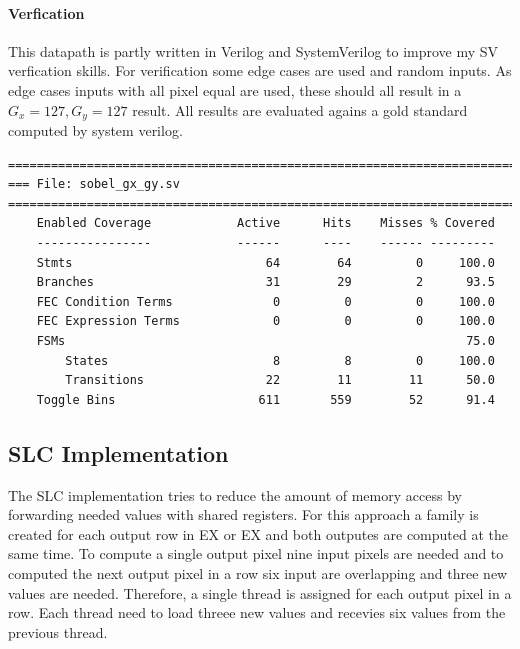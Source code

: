\documentclass[a4paper,fontsize=12pt]{scrartcl}
\begin{document}
\paragraph{Verfication}

This datapath is partly written in Verilog and SystemVerilog to improve my SV verfication skills. For verification some edge cases are used and random inputs. As edge cases inputs with all pixel equal are used, these should all result in a $G_x = 127, G_y = 127$ result. All results are evaluated agains a gold standard computed by system verilog.

\pagebreak

\begin{lstlisting}
=================================================================================
=== File: sobel_gx_gy.sv
=================================================================================
    Enabled Coverage            Active      Hits    Misses % Covered
    ----------------            ------      ----    ------ ---------
    Stmts                           64        64         0     100.0
    Branches                        31        29         2      93.5
    FEC Condition Terms              0         0         0     100.0
    FEC Expression Terms             0         0         0     100.0
    FSMs                                                        75.0
        States                       8         8         0     100.0
        Transitions                 22        11        11      50.0
    Toggle Bins                    611       559        52      91.4
\end{lstlisting}

\subsection{SLC Implementation}
The SLC implementation tries to reduce the amount of memory access by forwarding needed values with shared registers. For this approach a family is created for each output row in EX or EX and both outputes are computed at the same time. To compute a single output pixel nine input pixels are needed and to computed the next output pixel in a row six input are overlapping and three new values are needed. Therefore, a single thread is assigned for each output pixel in a row. Each thread need to load threee new values and recevies six values from the previous thread.
\end{document}
